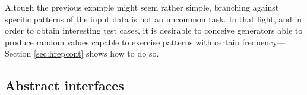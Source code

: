 


Altough the previous example might seem rather simple, branching against
specific patterns of the input data is not an uncommon task.
%
In that light, and in order to obtain interesting test cases, it is desirable to
conceive generators able to produce random values capable to exercise patterns
with certain frequency---Section \ref{sec:hrepcont} shows how to do so.



\subsection{Abstract interfaces}

